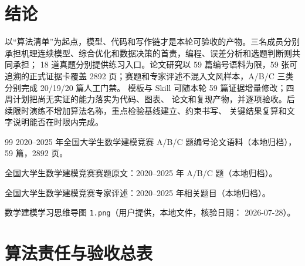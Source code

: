 \documentclass[UTF8,a4paper,12pt]{ctexart}
\begin{document}
\section{结论}

以“算法清单”为起点，模型、代码和写作链才是本轮可验收的产物。三名成员分别
承担机理连续模型、综合优化和数据决策的首责，编程、误差分析和选题判断则共同承担；
18 道真题分别提供练习入口。论文研究以 59 篇编号语料为限，59 张可追溯的正式证据卡覆盖
2892 页；赛题和专家评述不混入文风样本，A/B/C 三类分别完成 20/19/20 篇人工门禁。
模板与 Skill 可随本轮 59 篇证据增量修改；四周计划把尚无实证的能力落实为代码、图表、
论文和复现产物，并逐项验收。后续限时演练不增加算法名称，重点检验基线建立、约束书写、
关键结果复算和文字说明能否在时限内完成。

\begin{thebibliography}{99}
2020--2025 年全国大学生数学建模竞赛 A/B/C 题编号论文语料（本地归档），
59 篇，2892 页。

全国大学生数学建模竞赛赛题原文：2020--2025 年 A/B/C 题（本地归档）。

全国大学生数学建模竞赛专家评述：2020--2025 年相关题目（本地归档）。

数学建模学习思维导图 \texttt{1.png}（用户提供，本地文件，核验日期：
2026-07-28）。
\end{thebibliography}

\appendix
\section{算法责任与验收总表}
\end{document}
